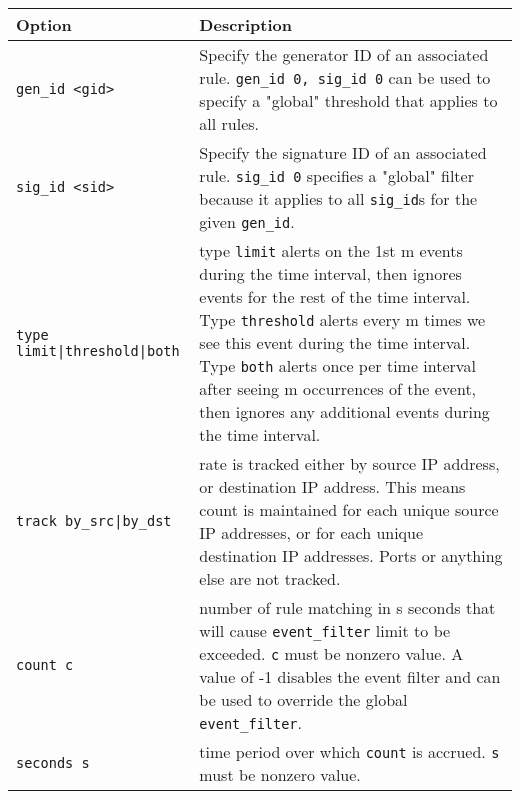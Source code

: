 \documentclass[english]{report}
\begin{document}
\begin{table}[h]
\begin{center}
\begin{tabular}{| l | p{4.5in} |}

\hline
\textbf{Option} & \textbf{Description}\\
\hline

\hline
\texttt{gen\_id <gid>} &

Specify the generator ID of an associated rule.  \texttt{gen\_id 0, sig\_id 0}
can be used to specify a "global" threshold that applies to all rules.\\

\hline \texttt{sig\_id <sid>} &

Specify the signature ID of an associated rule.  \texttt{sig\_id 0} specifies a
"global" filter because it applies to all \texttt{sig\_id}s for the given
\texttt{gen\_id}.\\

\hline
\texttt{type limit|threshold|both} &

type \texttt{limit} alerts on the 1st m events during the time interval, then
ignores events for the rest of the time interval.  Type \texttt{threshold}
alerts every m times we see this event during the time interval.  Type
\texttt{both} alerts once per time interval after seeing m occurrences of the
event, then ignores any additional events during the time interval.\\

\hline
\texttt{track by\_src|by\_dst} &

rate is tracked either by source IP address, or destination IP address.  This
means count is maintained for each unique source IP addresses, or for each
unique destination IP addresses.  Ports or anything else are not tracked.\\

\hline
\texttt{count c} &

number of rule matching in s seconds that will cause \texttt{event\_filter}
limit to be exceeded.  \texttt{c} must be nonzero value.  A value of -1 disables
the event filter and can be used to override the global \texttt{event\_filter}.\\

\hline
\texttt{seconds s} &

time period over which \texttt{count} is accrued.  \texttt{s} must be nonzero
value.\\

\hline
\end{tabular}
\end{center}
\end{table}
\end{document}

